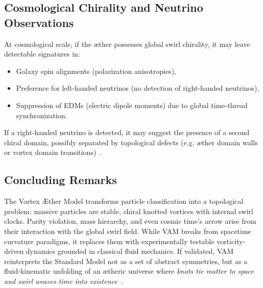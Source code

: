 \subsection*{Cosmological Chirality and Neutrino Observations}

At cosmological scale, if the æther possesses global swirl chirality, it may leave detectable signatures in:
\begin{itemize}
  \item Galaxy spin alignments (polarization anisotropies),
  \item Preference for left-handed neutrinos (no detection of right-handed neutrinos),
  \item Suppression of EDMs (electric dipole moments) due to global time-thread synchronization.
\end{itemize}
If a right-handed neutrino is detected, it may suggest the presence of a second chiral domain, possibly separated by topological defects (e.g. æther domain walls or vortex domain transitions)~\cite{iskandarani2025vam5}.

\subsection*{Concluding Remarks}

The Vortex Æther Model transforms particle classification into a topological problem: massive particles are stable, chiral knotted vortices with internal swirl clocks. Parity violation, mass hierarchy, and even cosmic time’s arrow arise from their interaction with the global swirl field. While VAM breaks from spacetime curvature paradigms, it replaces them with experimentally testable vorticity-driven dynamics grounded in classical fluid mechanics. If validated, VAM reinterprets the Standard Model not as a set of abstract symmetries, but as a fluid-kinematic unfolding of an ætheric universe where \emph{knots tie matter to space and swirl weaves time into existence}~\cite{iskandarani2025vam5}.


